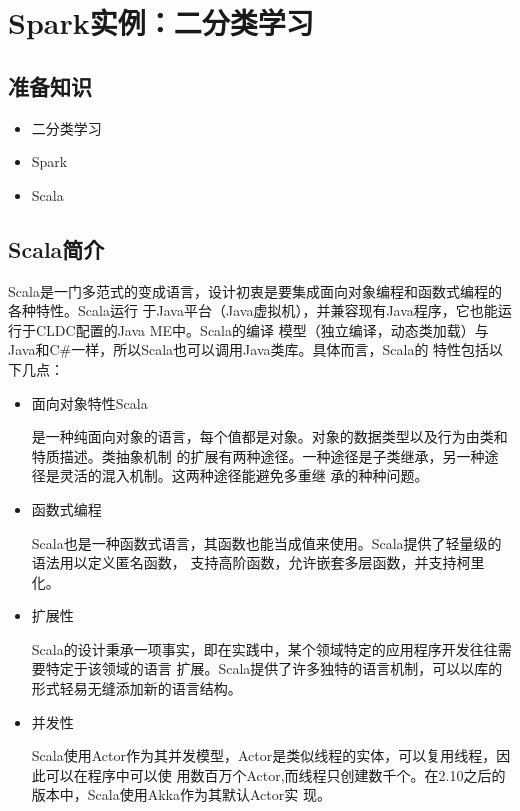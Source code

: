 \section{Spark实例：二分类学习}\label{ux5b9eux4f8bux5206ux6790ux7528-spark-ux8fdbux884cux4e8cux5206ux7c7bux5b66ux4e60}

\subsection{准备知识}\label{ux51c6ux5907ux77e5ux8bc6}

\begin{itemize}
\itemsep1pt\parskip0pt
\item
  二分类学习
\item
  Spark
\item
  Scala
\end{itemize}

\subsection{Scala简介}

Scala是一门多范式的变成语言，设计初衷是要集成面向对象编程和函数式编程的各种特性。Scala运行
于Java平台（Java虚拟机），并兼容现有Java程序，它也能运行于CLDC配置的Java ME中。Scala的编译
模型（独立编译，动态类加载）与Java和C\#一样，所以Scala也可以调用Java类库。具体而言，Scala的
特性包括以下几点：

\begin{itemize}
\item 面向对象特性Scala

  是一种纯面向对象的语言，每个值都是对象。对象的数据类型以及行为由类和特质描述。类抽象机制
  的扩展有两种途径。一种途径是子类继承，另一种途径是灵活的混入机制。这两种途径能避免多重继
  承的种种问题。

\item 函数式编程

  Scala也是一种函数式语言，其函数也能当成值来使用。Scala提供了轻量级的语法用以定义匿名函数，
  支持高阶函数，允许嵌套多层函数，并支持柯里化。

\item 扩展性

  Scala的设计秉承一项事实，即在实践中，某个领域特定的应用程序开发往往需要特定于该领域的语言
  扩展。Scala提供了许多独特的语言机制，可以以库的形式轻易无缝添加新的语言结构。

\item 并发性

  Scala使用Actor作为其并发模型，Actor是类似线程的实体，可以复用线程，因此可以在程序中可以使
  用数百万个Actor,而线程只创建数千个。在2.10之后的版本中，Scala使用Akka作为其默认Actor实
  现。
\end{itemize}

